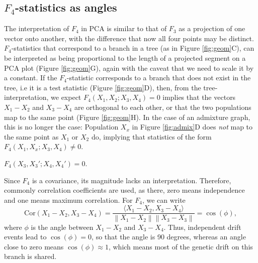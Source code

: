 \documentclass[12pt,fullpage, a4paper]{article}
\newcommand{\norm}[1]{\left\lVert#1\right\rVert}
\begin{document}
\subsection{$F_4$-statistics as angles}
The interpretation of $F_4$ in PCA is similar to that of $F_3$ as a projection of one vector onto another, with the difference that now all four points may be distinct. $F_4$-statistics that correspond to a branch in a tree (as in Figure \ref{fig:geom}C), can be interpreted as being proportional to the length of a projected segment on a PCA plot (Figure \ref{fig:geom}G), again with the caveat that we need to scale it by a constant. If the $F_4$-statistic corresponds to a branch that does not exist in the tree, i.e it is a test statistic (Figure \ref{fig:geom}D), then, from the tree-interpretation, we expect $F_4(X_1, X_2; X_3, X_4) = 0$ implies that the vectors $X_1 - X_2$ and $X_3 - X_4$ are orthogonal to each other, or that the two populations map to the same point (Figure \ref{fig:geom}H). In the case of an admixture graph, this is no longer the case: Population $X_x$ in Figure \ref{fig:admix}D does \emph{not} map to the same point as $X_1$ or $X_2$ do, implying that statistics of the form $F_4(X_1, X_x; X_3, X_4) \neq 0$.

$F_4(X_3, X_3'; X_4, X_4') = 0 $.

Since $F_4$ is a covariance, its magnitude lacks an interpretation. Therefore, commonly correlation coefficients are used, as there, zero means independence and one means maximum correlation. For $F_4$, we can write 
\begin{equation}
\text{Cor}(X_1 - X_2, X_3 - X_4) =  \frac{\langle X_1 - X_2, X_3 - X_4 \rangle}{\norm{X_1-X_2}\norm{X_3-X_3}} = \cos(\phi),\label{eq:angle}
\end{equation}
where $\phi$ is the angle between $X_1 - X_2$ and $X_3 - X_4$. Thus, independent drift events lead to $\cos(\phi) = 0$, so that the angle is 90 degrees, whereas an angle close to zero means $\cos(\phi)\approx 1$, which means most of the genetic drift on this branch is shared.
\end{document}

